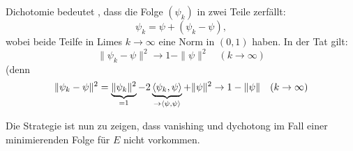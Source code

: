 \documentclass[
paper=a4,
bibtotocnumbered,
liststotocnumbered,
tablecaptionabove,
pointlessnumbers,
twoside,
openright,
10pt
]
{report}
\let\Re\relax\let\Im\relax
\DeclareMathOperator{\Re}{Re}
\DeclareMathOperator{\Im}{Im}
\theoremstyle{definition}
\numberwithin{equation}{chapter}
\begin{document}
Dichotomie bedeutet , dass die Folge $(\psi_k)$ in zwei Teile zerfällt:
\begin{equation}
\psi_k = \psi + (\psi_k - \psi),
\end{equation}
wobei beide Teilfe in Limes $k\to \infty$ eine Norm in $(0,1)$ haben. In der Tat gilt:
\begin{equation}
\| \psi_k- \psi\|^2 \to 1- \| \psi\|^2 \quad (k\to \infty)
\end{equation}
(denn $$\| \psi_k - \psi \|^2 = \underbrace{\| \psi_k \|^2}_{=1} - 2\Re\underbrace{\langle \psi_k, \psi\rangle}_{\to \langle \psi, \psi\rangle} + \| \psi\|^2\to 1- \| \psi\| \quad (k\to \infty)$$

Die Strategie ist nun zu zeigen, dass vanishing und dychotong im Fall einer minimierenden Folge für $E$ nicht vorkommen.  
\end{document}
